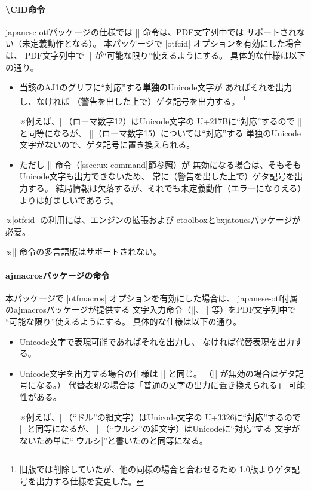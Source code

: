 \documentclass[uplatex,dvipdfmx,a4paper]{jsarticle}
\newcommand{\Pkg}[1]{\textsf{#1}}
\newcommand{\Note}{\par\noindent ※}
\begin{document}
\paragraph{\textbackslash CID命令}
\Pkg{japanese-otf}パッケージの仕様では |\CID| 命令は、PDF文字列中では
サポートされない（未定義動作となる）。
本パッケージで |otfcid| オプションを有効にした場合は、
PDF文字列中で |\CID| が“可能な限り”使えるようにする。
具体的な仕様は以下の通り。

\begin{itemize}
\item 当該のAJ1のグリフに“対応”する\textbf{単独の}Unicode文字が
  あればそれを出力し、なければ
  （警告を出した上で）ゲタ記号を出力する。
  \footnote{旧版では削除していたが、他の同様の場合と合わせるため
    1.0版よりゲタ記号を出力する仕様を変更した。}
  \Note 例えば、||（ローマ数字12）はUnicode文字の
  U+217Bに“対応”するので || と同等になるが、
  ||（ローマ数字15）については“対応”する
  単独のUnicode文字がないので、ゲタ記号に置き換えられる。
\item ただし |\Ux| 命令（\ref{ssec:ux-command}節参照）が
  無効になる場合は、そもそもUnicode文字も出力できないため、
  常に（警告を出した上で）ゲタ記号を出力する。
  結局情報は欠落するが、それでも未定義動作（エラーになりえる）
  よりは好ましいであろう。
\end{itemize}

\Note |otfcid| の利用には、エンジンの{\eTeX}拡張および
\Pkg{etoolbox}と\Pkg{bxjatoucs}パッケージが必要。
\Note |\CID| 命令の多言語版はサポートされない。

\paragraph{ajmacrosパッケージの命令}
本パッケージで |otfmacros| オプションを有効にした場合は、
\Pkg{japanese-otf}付属の\Pkg{ajmacros}パッケージが提供する
文字入力命令（|\ajMaru|、|\ajLig| 等）をPDF文字列中で
“可能な限り”使えるようにする。
具体的な仕様は以下の通り。

\begin{itemize}
\item Unicode文字で表現可能であればそれを出力し、
  なければ代替表現を出力する。
\item Unicode文字を出力する場合の仕様は |\CID| と同じ。
  （|\Ux| が無効の場合はゲタ記号になる。）
  代替表現の場合は「普通の文字の出力に置き換えられる」
  可能性がある。
  \Note 例えば、||（“ドル”の組文字）はUnicode文字の
  U+3326に“対応”するので || と同等になるが、
  ||（“ウルシ”の組文字）はUnicodeに“対応”する
  文字がないため単に“|ウルシ|”と書いたのと同等になる。
\end{itemize}
\end{document}
